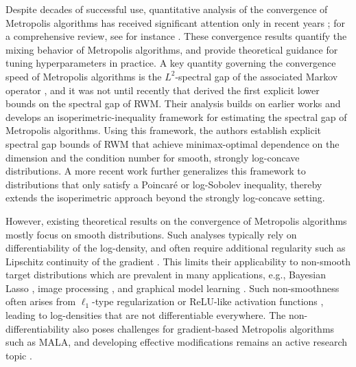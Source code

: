 \documentclass[11pt]{article}
\begin{document}
Despite decades of successful use, quantitative analysis of the convergence of Metropolis algorithms has received significant attention only in recent years \citep{pmlr-v75-dwivedi18a,pmlr-v134-chewi21a,24-AAP2058,goyal2025mixing}; for a comprehensive review, see for instance \cite{24-AAP2058}.
These convergence results quantify the mixing behavior of Metropolis algorithms, and provide theoretical guidance for tuning hyperparameters in practice.
%
A key quantity governing the convergence speed of Metropolis algorithms is the $L^2$-spectral gap of the associated Markov operator \citep{MR2466937,MR3155209}, and it was not until recently that \citet{24-AAP2058} derived the first explicit lower bounds on the spectral gap of RWM.
%
Their analysis builds on earlier works \citep{MR2178341,pmlr-v75-dwivedi18a} and develops an isoperimetric-inequality framework for estimating the spectral gap of Metropolis algorithms.
Using this framework, the authors establish explicit spectral gap bounds of RWM that achieve minimax-optimal dependence on the dimension and the condition number for smooth, strongly log-concave distributions.
%
A more recent work \citep{goyal2025mixing} further generalizes this framework to distributions that only satisfy a Poincar\'e or log-Sobolev inequality, thereby extends the isoperimetric approach beyond the strongly log-concave setting.



However, existing theoretical results on the convergence of Metropolis algorithms mostly focus on smooth distributions.
Such analyses typically rely on differentiability of the log-density, and often require additional regularity such as Lipschitz continuity of the gradient \citep{pmlr-v75-dwivedi18a,JMLR:v23:21-1184,24-AAP2058}.
%
This limits their applicability to non-smooth target distributions which are prevalent in many applications, e.g., Bayesian Lasso \citep{Park01062008,MR2370074}, image processing \citep{MR3763089,24M1694781}, and graphical model learning \citep{MAL-001}.
Such non-smoothness often arises from $\ell_1$-type regularization or ReLU-like activation functions \citep{pmlr-v97-vladimirova19a}, leading to log-densities that are not differentiable everywhere.
%
The non-differentiability also poses challenges for gradient-based Metropolis algorithms such as MALA, and developing effective modifications remains an active research topic \citep{MR3515019,JMLR:v23:20-527}.
\end{document}
